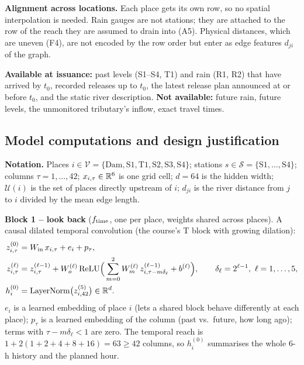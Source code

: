 \textbf{Alignment across locations.} Each place gets its own row, so no spatial interpolation is needed. Rain gauges are not stations; they are attached to the row of the reach they are assumed to drain into (A5). Physical distances, which are uneven (F4), are not encoded by the row order but enter as edge features $d_{ji}$ of the graph.

\textbf{Available at issuance:} past levels (S1--S4, T1) and rain (R1, R2) that have arrived by $t_0$, recorded releases up to $t_0$, the latest release plan announced at or before $t_0$, and the static river description. \textbf{Not available:} future rain, future levels, the unmonitored tributary's inflow, exact travel times.

\subsection{Model computations and design justification}

\textbf{Notation.} Places $i\in\mathcal V=\{\text{Dam},\text{S1},\text{T1},\text{S2},\text{S3},\text{S4}\}$; stations $s\in\mathcal S=\{\text{S1},\dots,\text{S4}\}$; columns $\tau=1,\dots,42$; $x_{i,\tau}\in\mathbb{R}^{6}$ is one grid cell; $d=64$ is the hidden width; $\mathcal U(i)$ is the set of places directly upstream of $i$; $d_{ji}$ is the river distance from $j$ to $i$ divided by the mean edge length.

\textbf{Block 1 -- look back} ($f_{\mathrm{time}}$, one per place, weights shared across places). A causal dilated temporal convolution (the course's T block with growing dilation):
\begin{align}
z^{(0)}_{i,\tau} &= W_{\mathrm{in}}\,x_{i,\tau} + e_i + p_\tau, \\
z^{(\ell)}_{i,\tau} &= z^{(\ell-1)}_{i,\tau} + W^{(\ell)}_{o}\,\mathrm{ReLU}\Big(\sum_{m=0}^{2} W^{(\ell)}_{m}\, z^{(\ell-1)}_{i,\tau-m\delta_\ell} + b^{(\ell)}\Big),\qquad \delta_\ell=2^{\ell-1},\ \ell=1,\dots,5,\\
h^{(0)}_i &= \mathrm{LayerNorm}\big(z^{(5)}_{i,42}\big)\in\mathbb{R}^{d}.
\end{align}
$e_i$ is a learned embedding of place $i$ (lets a shared block behave differently at each place); $p_\tau$ is a learned embedding of the column (past vs.\ future, how long ago); terms with $\tau-m\delta_\ell<1$ are zero. The temporal reach is $1+2(1+2+4+8+16)=63\ge42$ columns, so $h^{(0)}_i$ summarises the whole 6-h history and the planned hour.

